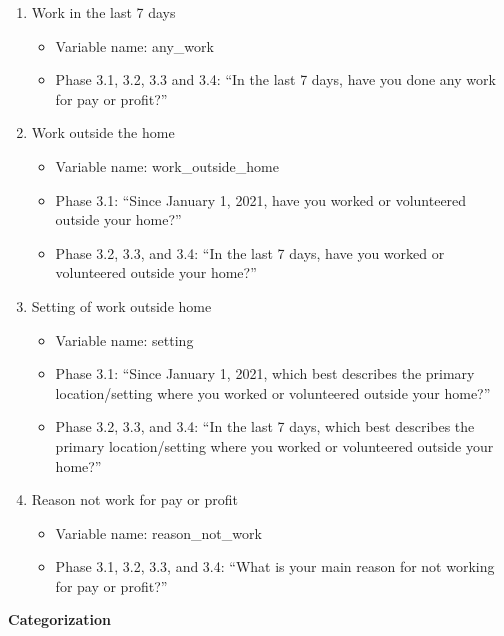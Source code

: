 \documentclass[
]{article}
\providecommand{\tightlist}{%
  \setlength{\itemsep}{0pt}\setlength{\parskip}{0pt}}
\begin{document}
\begin{enumerate}
\def\labelenumi{\arabic{enumi}.}
\tightlist
\item
  Work in the last 7 days

  \begin{itemize}
  \tightlist
  \item
    Variable name: any\_work
  \item
    Phase 3.1, 3.2, 3.3 and 3.4: ``In the last 7 days, have you done any
    work for pay or profit?''
  \end{itemize}
\item
  Work outside the home

  \begin{itemize}
  \tightlist
  \item
    Variable name: work\_outside\_home
  \item
    Phase 3.1: ``Since January 1, 2021, have you worked or volunteered
    outside your home?''
  \item
    Phase 3.2, 3.3, and 3.4: ``In the last 7 days, have you worked or
    volunteered outside your home?''
  \end{itemize}
\item
  Setting of work outside home

  \begin{itemize}
  \tightlist
  \item
    Variable name: setting
  \item
    Phase 3.1: ``Since January 1, 2021, which best describes the primary
    location/setting where you worked or volunteered outside your
    home?''
  \item
    Phase 3.2, 3.3, and 3.4: ``In the last 7 days, which best describes
    the primary location/setting where you worked or volunteered outside
    your home?''
  \end{itemize}
\item
  Reason not work for pay or profit

  \begin{itemize}
  \tightlist
  \item
    Variable name: reason\_not\_work
  \item
    Phase 3.1, 3.2, 3.3, and 3.4: ``What is your main reason for not
    working for pay or profit?''
  \end{itemize}
\end{enumerate}

\textbf{Categorization}
\end{document}
